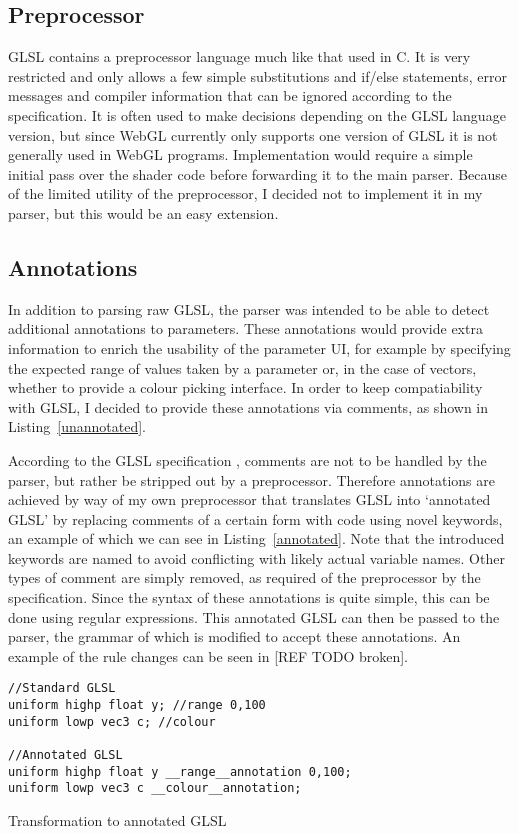 \documentclass[12pt,twoside,notitlepage]{report}
\begin{document}
\subsection{Preprocessor}
GLSL contains a preprocessor language much like that used in C. It is very restricted and only allows a few simple substitutions and if/else statements, error messages and compiler information that can be ignored according to the specification. It is often used to make decisions depending on the GLSL language version, but since {WebGL} currently only supports one version of GLSL it is not generally used in WebGL programs. Implementation would require a simple initial pass over the shader code before forwarding it to the main parser. Because of the limited utility of the preprocessor, I decided not to implement it in my parser, but this would be an easy extension.

\subsection{Annotations}
\label{annotations}
In addition to parsing raw GLSL, the parser was intended to be able to detect additional annotations to parameters. These annotations would provide extra information to enrich the usability of the parameter UI, for example by specifying the expected range of values taken by a parameter or, in the case of vectors, whether to provide a colour picking interface. In order to keep compatiability with GLSL, I decided to provide these annotations via comments, as shown in Listing~\ref{unannotated}. 

According to the GLSL specification \cite{glsl-spec}, comments are not to be handled by the parser, but rather be stripped out by a preprocessor. Therefore annotations are achieved by way of my own preprocessor that translates GLSL into `annotated GLSL' by replacing comments of a certain form with code using novel keywords, an example of which we can see in Listing~\ref{annotated}. Note that the introduced keywords are named to avoid conflicting with likely actual variable names. Other types of comment are simply removed, as required of the preprocessor by the specification. Since the syntax of these annotations is quite simple, this can be done using regular expressions. This annotated GLSL can then be passed to the parser, the grammar of which is modified to accept these annotations. An example of the rule changes can be seen in [REF TODO broken].

\begin{listing}
\begin{verbatim}
//Standard GLSL
uniform highp float y; //range 0,100
uniform lowp vec3 c; //colour

//Annotated GLSL
uniform highp float y __range__annotation 0,100;
uniform lowp vec3 c __colour__annotation;
\end{verbatim}
\caption{Transformation to annotated GLSL\label{annotated}}
\end{listing}
\end{document}
